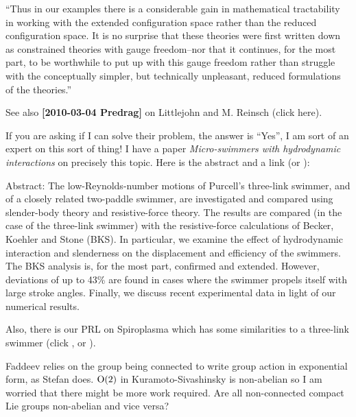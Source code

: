 \begin{description}
``Thus in our examples there is a considerable gain in mathematical tractability in
working with the extended configuration space rather than the reduced configuration
space. It is no surprise that these theories were first written down as constrained
theories with gauge freedom--nor that it continues, for the most part, to be
worthwhile to put up with this gauge freedom rather than struggle with the
conceptually simpler, but technically unpleasant, reduced formulations of the
theories.''

\item[2013-11-14 Predrag]
See also  {\bf [2010-03-04 Predrag]} on Littlejohn
and M. Reinsch (click
 {here}).


\item[2012-02-19 Greg Huber]
If you are asking if I can solve their problem, the answer is ``Yes'', I
am sort of an expert on this sort of thing! I have a paper
{\em Micro-swimmers with hydrodynamic interactions} on precisely this
topic. Here is the abstract and a
{link} (or
):

Abstract:  The low-Reynolds-number motions of Purcell's three-link
swimmer, and of a closely related two-paddle swimmer, are investigated
and compared using slender-body theory and resistive-force theory. The
results are compared (in the case of the three-link swimmer) with the
resistive-force calculations of Becker, Koehler and Stone
(BKS). In particular, we examine the effect of hydrodynamic interaction
and slenderness on the displacement and efficiency of the swimmers. The
BKS analysis is, for the most part, confirmed and extended. However,
deviations of up to 43\% are found in cases where the swimmer propels
itself with large stroke angles. Finally, we discuss recent experimental
data in light of our numerical results.

Also, there is our PRL on Spiroplasma which has some
similarities to a three-link swimmer (click
,
or
).

\item[2012-06-15 Evangelos]
Faddeev relies on the group being connected to write group action in
exponential form, as Stefan does. $\textrm{O}(2)$ in Kuramoto-Sivashinsky is
non-abelian so I am worried that there might be more work required. Are
all non-connected compact Lie groups non-abelian and vice versa?


\end{description}
